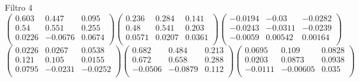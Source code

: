 Filtro 4
{ \small
\[
\begin{pmatrix}
  0.603 & 0.447 & 0.095 \\
  0.54 & 0.551 & 0.255 \\
  0.0226 & -0.0676 & 0.0674 \\
\end{pmatrix}
\begin{pmatrix}
  0.236 & 0.284 & 0.141 \\
  0.48 & 0.541 & 0.203 \\
  0.0571 & 0.0207 & 0.0361 \\
\end{pmatrix}
\begin{pmatrix}
  -0.0194 & -0.03 & -0.0282 \\
  -0.0243 & -0.0311 & -0.0239 \\
  -0.0059 & 0.00542 & 0.00164 \\
\end{pmatrix}
\]
\[
\begin{pmatrix}
  0.0226 & 0.0267 & 0.0538 \\
  0.121 & 0.105 & 0.0155 \\
  0.0795 & -0.0231 & -0.0252 \\
\end{pmatrix}
\begin{pmatrix}
  0.682 & 0.484 & 0.213 \\
  0.672 & 0.658 & 0.288 \\
  -0.0506 & -0.0879 & 0.112 \\
\end{pmatrix}
\begin{pmatrix}
  0.0695 & 0.109 & 0.0828 \\
  0.0203 & 0.0873 & 0.0938 \\
  -0.0111 & -0.00605 & 0.035 \\
\end{pmatrix}
\]
}

